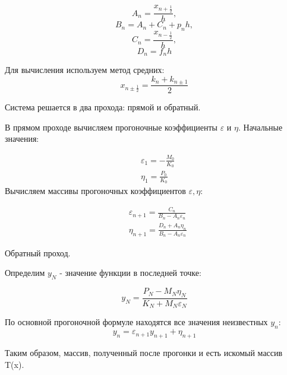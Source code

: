 \documentclass[a4paper, 14pt]{article}
\begin{document}
\begin{equation}
A_n=\frac{x_{n+\frac{1}{2}}}{h},
\end{equation}
\begin{equation}
B_n=A_n+C_n+p_nh,
\end{equation}
\begin{equation}
C_n=\frac{x_{n-\frac{1}{2}}}{h},
\end{equation}
\begin{equation}
D_n=f_nh
\end{equation}

Для вычисления используем метод средних:
\begin{equation}
x_{n\pm\frac{1}{2}}=\frac{k_n+k_{n\pm1}}{2}
\end{equation}

Система решается в два прохода: прямой и обратный.

В прямом проходе вычисляем прогоночные коэффициенты $\varepsilon$ и $\eta$. Начальные значения:

\begin{equation}
\begin{aligned}
&\varepsilon_1=-\frac{M_0}{K_0}\\
&\eta_1=\frac{P_0}{K_0}
\end{aligned}
\end{equation}
\newpage
Вычисляем массивы прогоночных коэффициентов $\varepsilon, \eta$:

\begin{equation}
\begin{aligned}
&\varepsilon_{n+1} = \frac{C_n}{B_n-A_n\varepsilon_n}\\
&\eta_{n+1} = \frac{D_n+A_n\eta_n}{B_n-A_n\varepsilon_n}
\end{aligned}
\end{equation}

Обратный проход.

Определим $y_N$ - значение функции в последней точке:

\begin{equation}
y_N=\frac{P_N-M_N\eta_N}{K_N+M_N\varepsilon_N}
\end{equation}

По основной прогоночной формуле находятся все значения неизвестных $y_n$:
\begin{equation}
y_n=\varepsilon_{n+1}y_{n+1}+\eta_{n+1}
\end{equation}

Таким образом, массив, полученный после прогонки и есть искомый массив T(x). \\
\end{document}
